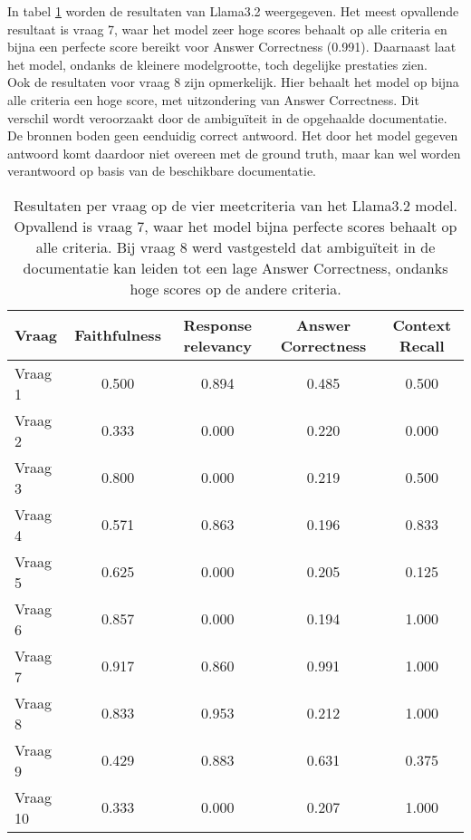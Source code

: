 In tabel \ref{tab:resultaten_vragen_llama3.2} worden de resultaten van Llama3.2 weergegeven. Het meest opvallende resultaat is vraag 7, waar het model zeer hoge scores behaalt op alle criteria en bijna een perfecte score bereikt voor Answer Correctness (0.991). Daarnaast laat het model, ondanks de kleinere modelgrootte, toch degelijke prestaties zien.
\\[1em]
Ook de resultaten voor vraag 8 zijn opmerkelijk. Hier behaalt het model op bijna alle criteria een hoge score, met uitzondering van Answer Correctness. Dit verschil wordt veroorzaakt door de ambiguïteit in de opgehaalde documentatie. De bronnen boden geen eenduidig correct antwoord. Het door het model gegeven antwoord komt daardoor niet overeen met de ground truth, maar kan wel worden verantwoord op basis van de beschikbare documentatie.
\begin{table}[H]
    \centering
    \begin{tabular}{|l|c|c|c|c|}
        \hline
        \textbf{Vraag} & \textbf{Faithfulness} & \textbf{Response relevancy} & \textbf{Answer Correctness} & \textbf{Context Recall} \\
        \hline
        Vraag 1  & 0.500 & 0.894 & 0.485 & 0.500 \\
        Vraag 2  & 0.333 & 0.000 & 0.220 & 0.000 \\
        Vraag 3  & 0.800 & 0.000 & 0.219 & 0.500 \\
        Vraag 4  & 0.571 & 0.863 & 0.196 & 0.833 \\
        Vraag 5  & 0.625 & 0.000 & 0.205 & 0.125 \\
        Vraag 6  & 0.857 & 0.000 & 0.194 & 1.000 \\
        Vraag 7  & 0.917 & 0.860 & 0.991 & 1.000 \\
        Vraag 8  & 0.833 & 0.953 & 0.212 & 1.000 \\
        Vraag 9  & 0.429 & 0.883 & 0.631 & 0.375 \\
        Vraag 10 & 0.333 & 0.000 & 0.207 & 1.000 \\
        \hline
    \end{tabular}
    \caption{Resultaten per vraag op de vier meetcriteria van het Llama3.2 model. Opvallend is vraag 7, waar het model bijna perfecte scores behaalt op alle criteria. Bij vraag 8 werd vastgesteld dat ambiguïteit in de documentatie kan leiden tot een lage Answer Correctness, ondanks hoge scores op de andere criteria.}
    \label{tab:resultaten_vragen_llama3.2}
\end{table}


